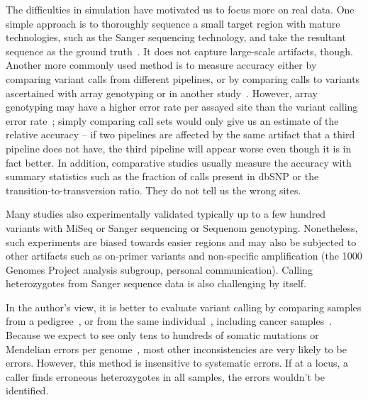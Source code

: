 \documentclass{bioinfo}
\begin{document}
The difficulties in simulation have motivated us to focus more on real data. One
simple approach is to thoroughly sequence a small target region with mature
technologies, such as the Sanger sequencing technology, and take the resultant sequence as
the ground truth~\citep{Harismendy:2009aa}. It does not capture large-scale
artifacts, though. Another more commonly used method is to measure accuracy
either by comparing variant calls from different pipelines, or by comparing
calls to variants ascertained with array genotyping or in another
study~\citep{Clark:2011aa,Li:2012fk,Lam:2012aa,Lam:2012fk,Boland:2013aa,Liu:2013aa,Goode:2013aa,ORawe:2013aa,Zook:2014aa,Cheng:2014aa}.
However, array genotyping may have a higher error rate per assayed site than
the variant calling error rate~\citep{Bentley:2008cr}; simply comparing call
sets would only give us an estimate of the relative accuracy -- if two
pipelines are affected by the same artifact that a third pipeline does
not have, the third pipeline will appear worse even though it is in fact
better.  In addition, comparative studies usually measure the accuracy with
summary statistics such as the fraction of calls present in dbSNP or the
transition-to-transversion ratio.  They do not tell us the wrong sites.

Many studies also experimentally validated typically up to a few hundred
variants with MiSeq or Sanger sequencing or Sequenom genotyping. Nonetheless,
such experiments are biased towards easier regions and may also be subjected
to other artifacts such as on-primer variants and non-specific amplification
(the 1000 Genomes Project analysis subgroup, personal communication).
Calling heterozygotes from Sanger sequence data is also challenging by itself.


In the author's view, it is better to evaluate variant calling by
comparing samples from a pedigree~\citep{Zook:2014aa}, or from the same
individual~\citep{Nickles:2012aa}, including cancer
samples~\citep{Lower:2012aa}. Because we expect to see only tens to hundreds of
somatic mutations or Mendelian errors per genome~\citep{Conrad:2011kx}, most other inconsistencies
are very likely to be errors. However, this method is insensitive to systematic
errors.  If at a locus, a caller finds erroneous heterozygotes in all samples,
the errors wouldn't be identified.
\end{document}
